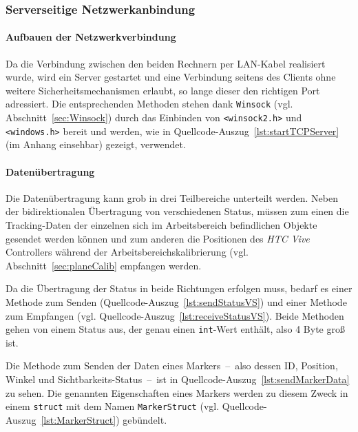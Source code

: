\subsubsection{Serverseitige Netzwerkanbindung}\label{sec:serverClient}
\paragraph{Aufbauen der Netzwerkverbindung}
Da die Verbindung zwischen den beiden Rechnern per LAN-Kabel realisiert wurde, wird ein Server gestartet und eine Verbindung seitens des Clients ohne weitere Sicherheitsmechanismen erlaubt, so lange dieser den richtigen Port adressiert. Die entsprechenden Methoden stehen dank \texttt{Winsock} (vgl. Abschnitt~\ref{sec:Winsock}) durch das Einbinden von \texttt{<winsock2.h>} und \texttt{<windows.h>} bereit und werden, wie in Quellcode-Auszug~\ref{lst:startTCPServer} (im Anhang einsehbar) gezeigt, verwendet. 

\paragraph{Datenübertragung}
Die Datenübertragung kann grob in drei Teilbereiche unterteilt werden. Neben der bidirektionalen Übertragung von verschiedenen Status, müssen zum einen die Tracking-Daten der einzelnen sich im Arbeitsbereich befindlichen Objekte gesendet werden können und zum anderen die Positionen des \emph{HTC Vive} Controllers während der Arbeitsbereichskalibrierung (vgl. Abschnitt~\ref{sec:planeCalib} empfangen werden.

 

Da die Übertragung der Status in beide Richtungen erfolgen muss, bedarf es einer Methode zum Senden (Quellcode-Auszug~\ref{lst:sendStatusVS})  und einer Methode zum Empfangen (vgl. Quellcode-Auszug~\ref{lst:receiveStatusVS}). Beide Methoden gehen von einem Status aus, der genau einen \texttt{int}-Wert enthält, also 4 Byte groß ist.



Die Methode zum Senden der Daten eines Markers~--~also dessen ID, Position, Winkel und Sichtbarkeits-Status~--~ist in Quellcode-Auszug~\ref{lst:sendMarkerData} zu sehen. Die genannten Eigenschaften eines Markers werden zu diesem Zweck in einem \texttt{struct} mit dem Namen \texttt{Marker\-Struct} (vgl. Quellcode-Auszug~\ref{lst:MarkerStruct}) gebündelt. 


